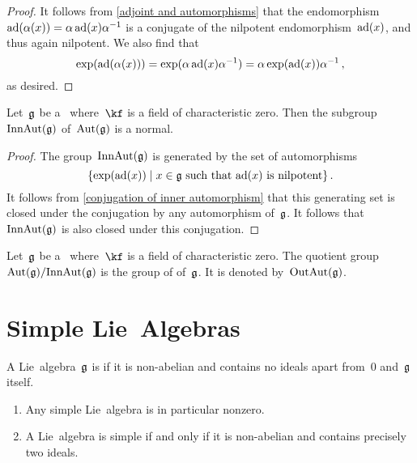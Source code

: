 \begin{proof}
  It follows from \cref{adjoint and automorphisms} that the endomorphism~$\operatorname{ad}(\alpha(x)) = \alpha \operatorname{ad}(x) \alpha^{-1}$ is a conjugate of the nilpotent endomorphism~$\operatorname{ad}(x)$, and thus again nilpotent.
  We also find that
  \[
    \exp( \operatorname{ad}(\alpha(x)) )
    =
    \exp( \alpha \operatorname{ad}(x) \alpha^{-1} )
    =
    \alpha \exp(\operatorname{ad}(x)) \alpha^{-1} \,,
  \]
  as desired.
\end{proof}


\begin{proposition}
  Let~$\mathfrak{g}$ be a~\liealgebra{$\kf$} where~$\kf$ is a field of characteristic zero.
  Then the subgroup~$\operatorname{InnAut}(\mathfrak{g})$ of~$\operatorname{Aut}(\mathfrak{g})$ is a normal.
\end{proposition}


\begin{proof}
  The group~$\operatorname{InnAut}(\mathfrak{g})$ is generated by the set of automorphisms
  \[
    \{
      \exp(\ad(x))
    \suchthat
      \text{$x \in \glie$ such that~$\ad(x)$ is nilpotent}
    \} \,.
  \]
  It follows from \cref{conjugation of inner automorphism} that this generating set is closed under the conjugation by any automorphism of~$\mathfrak{g}$.
  It follows that~$\operatorname{InnAut}(\mathfrak{g})$ is also closed under this conjugation.
\end{proof}


\begin{definition}
  Let~$\mathfrak{g}$ be a~\liealgebra{$\kf$} where~$\kf$ is a field of characteristic zero.
  The quotient group~$\operatorname{Aut}(\mathfrak{g}) / {\operatorname{InnAut}(\mathfrak{g})}$ is the group of  of~$\mathfrak{g}$.
  It is denoted by~$\operatorname{OutAut}(\mathfrak{g})$.
\end{definition}





\section{Simple Lie~Algebras}


\begin{definition}
 A Lie~algebra~$\mathfrak{g}$ is  if it is non-abelian and contains no ideals apart from~$0$ and~$\mathfrak{g}$ itself.
\end{definition}


\begin{remark}
  \leavevmode
  \begin{enumerate}
    \item
      Any simple Lie~algebra is in particular nonzero.
    \item
      A Lie~algebra is simple if and only if it is non-abelian and contains precisely two ideals.
  \end{enumerate}
\end{remark}


